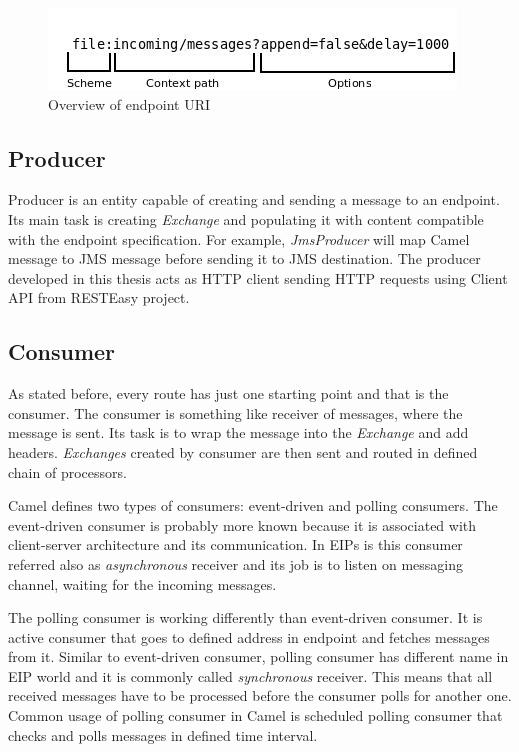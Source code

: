 \documentclass[12pt,final,oneside]{fithesis2}
\begin{document}
\begin{figure}
\centering
\includegraphics[width=0.9\linewidth]{images/Diagram1.jpeg}
\caption{Overview of endpoint URI}
\label{uri}
\end{figure}

\subsection*{Producer}
Producer is an entity capable of creating and sending a message to an endpoint. Its main task is creating \textit{Exchange} and populating it with content compatible with the endpoint specification. For example, \textit{JmsProducer} will map Camel message to JMS message before sending it to JMS destination. The producer developed in this thesis acts as HTTP client sending HTTP requests using Client API from RESTEasy project.


\subsection*{Consumer} 
As stated before, every route has just one starting point and that is the consumer. The consumer is something like receiver of messages, where the message is sent. Its task is to wrap the message into the \textit{Exchange} and add headers. \textit{Exchanges} created by consumer are then sent and routed in defined chain of processors.

Camel defines two types of consumers: event-driven and polling consumers. The event-driven consumer is probably more known because it is associated with client-server architecture and its communication. In EIPs is this consumer referred also as \textit{asynchronous} receiver and its job is to listen on messaging channel, waiting for the incoming messages.

The polling consumer is working differently than event-driven consumer. It is active consumer that goes to defined address in endpoint and fetches messages from it. Similar to event-driven consumer, polling consumer has different name in EIP world and it is commonly called \textit{synchronous} receiver. This means that all received messages have to be processed before the consumer polls for another one. Common usage of polling consumer in Camel is scheduled polling consumer that checks and polls messages in defined time interval.
\end{document}
